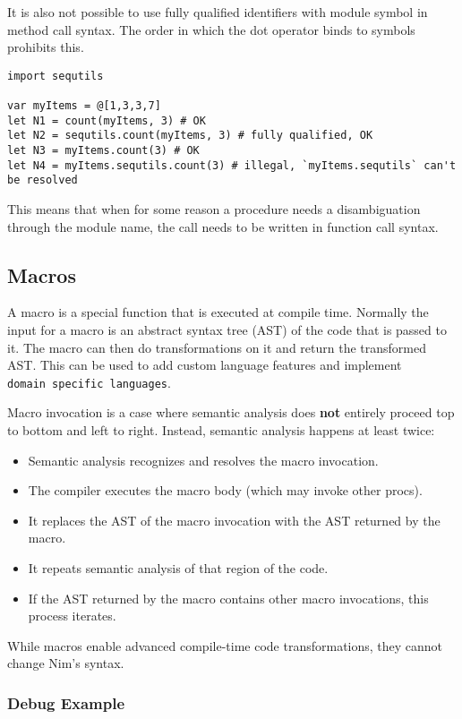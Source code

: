 It is also not possible to use fully qualified identifiers with module
symbol in method call syntax. The order in which the dot operator binds
to symbols prohibits this.

\begin{verbatim}
import sequtils

var myItems = @[1,3,3,7]
let N1 = count(myItems, 3) # OK
let N2 = sequtils.count(myItems, 3) # fully qualified, OK
let N3 = myItems.count(3) # OK
let N4 = myItems.sequtils.count(3) # illegal, `myItems.sequtils` can't be resolved
\end{verbatim}

This means that when for some reason a procedure needs a disambiguation
through the module name, the call needs to be written in function call
syntax.

\hypertarget{macros}{%
\subsection{Macros}\label{macros}}

A macro is a special function that is executed at compile time. Normally
the input for a macro is an abstract syntax tree (AST) of the code that
is passed to it. The macro can then do transformations on it and return
the transformed AST. This can be used to add custom language features
and implement \texttt{domain\ specific\ languages}.

Macro invocation is a case where semantic analysis does \textbf{not}
entirely proceed top to bottom and left to right. Instead, semantic
analysis happens at least twice:

\begin{itemize}
\tightlist
\item
  Semantic analysis recognizes and resolves the macro invocation.
\item
  The compiler executes the macro body (which may invoke other procs).
\item
  It replaces the AST of the macro invocation with the AST returned by
  the macro.
\item
  It repeats semantic analysis of that region of the code.
\item
  If the AST returned by the macro contains other macro invocations,
  this process iterates.
\end{itemize}

While macros enable advanced compile-time code transformations, they
cannot change Nim's syntax.

\hypertarget{debug-example}{%
\subsubsection{Debug Example}\label{debug-example}}

